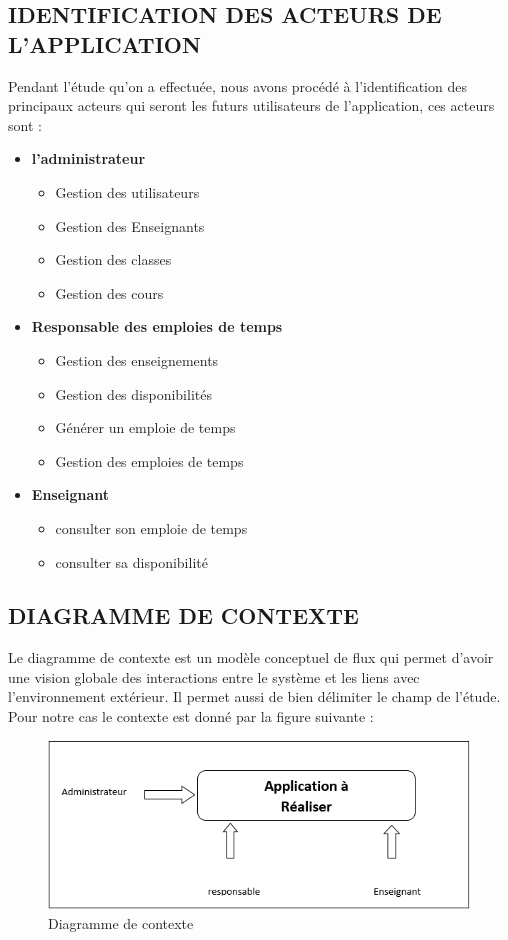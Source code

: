 \documentclass[english,12pt,a4paper]{report}
\begin{document}
\subsection{IDENTIFICATION DES ACTEURS DE L'APPLICATION}
Pendant l’étude qu’on a effectuée, nous avons procédé à l’identification des
principaux acteurs qui seront les futurs utilisateurs de l’application, ces acteurs
sont :
\begin{itemize}
	\item \textbf{l'administrateur}
	\begin{itemize}
		\item Gestion des utilisateurs
		\item Gestion des Enseignants
		\item Gestion des classes
		\item Gestion des cours
	\end{itemize}
	\item \textbf{Responsable des emploies de temps}
	\begin{itemize}
		\item Gestion des enseignements
		\item Gestion des disponibilités
		\item  Générer un emploie de temps
		\item Gestion des emploies de temps
	\end{itemize}
	\item \textbf{Enseignant}
	\begin{itemize}
		\item consulter son emploie de temps
		\item consulter sa disponibilité
	\end{itemize}
\end{itemize}

\subsection{DIAGRAMME DE CONTEXTE}
Le diagramme de contexte est un modèle conceptuel de flux qui permet d’avoir
une vision globale des interactions entre le système et les liens avec
l’environnement extérieur. Il permet aussi de bien délimiter le champ de l’étude. Pour notre cas le contexte est donné par la figure suivante :
\begin{figure}[h]
	\centering
	\includegraphics[width=1\textwidth]{dContext.png}
	\caption{Diagramme de contexte}
	\label{fig1: diagramme de contexte}
\end{figure}
\end{document}
